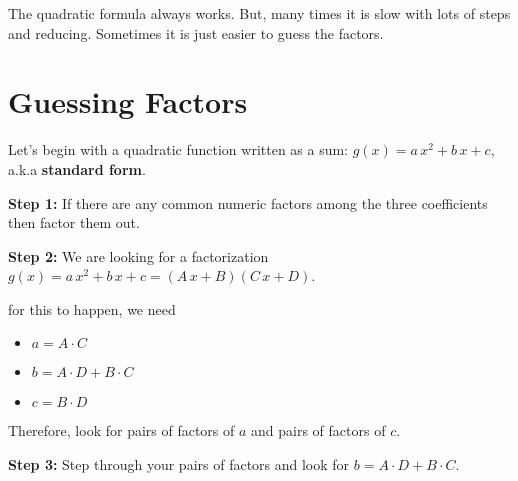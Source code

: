 \documentclass{ximera}
\begin{document}
The quadratic formula always works.  But, many times it is slow with lots of steps and reducing.  Sometimes it is just easier to guess the factors.




















\section{Guessing Factors}


Let's begin with a quadratic function written as a sum: $g(x) = a \, x^2 + b \, x + c$, a.k.a \textbf{standard form}.  


\textbf{\textcolor{blue!75!black}{Step 1:}} If there are any common numeric factors among the three coefficients then factor them out.


\textbf{\textcolor{blue!75!black}{Step 2:}} We are looking for a factorization $g(x) = a \, x^2 + b \, x + c = (A \, x + B)(C \, x + D)$.

for this to happen, we need

\begin{itemize}
\item $a = A \cdot C $
\item $b = A\cdot D + B \cdot C$
\item $c = B \cdot D$
\end{itemize}

Therefore, look for pairs of factors of $a$ and pairs of factors of $c$.






\textbf{\textcolor{blue!75!black}{Step 3:}} Step through your pairs of factors and look for $b = A \cdot D + B \cdot C$.
\end{document}
